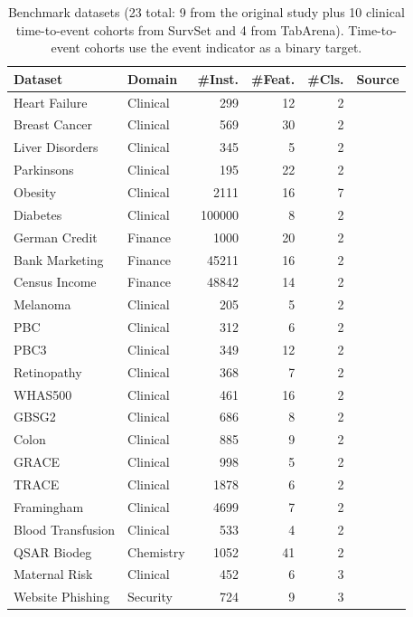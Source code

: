 \documentclass[10pt]{article}\usepackage[margin=1.5cm]{geometry}\usepackage{booktabs,url}\usepackage[numbers]{natbib}
\begin{document}
\begin{table}[t]\centering\small
\setlength{\tabcolsep}{5pt}\renewcommand{\arraystretch}{1.05}
\caption{Benchmark datasets (23 total: 9 from the original study plus 10 clinical time-to-event cohorts from SurvSet and 4 from TabArena). Time-to-event cohorts use the event indicator as a binary target.}
\label{tab:datasets}
\begin{tabular}{@{}llrrrl@{}}\toprule
\textbf{Dataset} & \textbf{Domain} & \textbf{\#Inst.} & \textbf{\#Feat.} & \textbf{\#Cls.} & \textbf{Source} \\ \midrule
Heart Failure & Clinical & 299 & 12 & 2 & \cite{chicco2020ml} \\
Breast Cancer & Clinical & 569 & 30 & 2 & \cite{uci} \\
Liver Disorders & Clinical & 345 & 5 & 2 & \cite{uci} \\
Parkinsons & Clinical & 195 & 22 & 2 & \cite{little2007exploiting} \\
Obesity & Clinical & 2111 & 16 & 7 & \cite{palechor2019dataset} \\
Diabetes & Clinical & 100000 & 8 & 2 & \cite{kaggle_diabetes} \\
German Credit & Finance & 1000 & 20 & 2 & \cite{uci} \\
Bank Marketing & Finance & 45211 & 16 & 2 & \cite{moro2014data} \\
Census Income & Finance & 48842 & 14 & 2 & \cite{kohavi1996scaling} \\
Melanoma & Clinical & 205 & 5 & 2 & \cite{drysdale2022survset} \\
PBC & Clinical & 312 & 6 & 2 & \cite{drysdale2022survset} \\
PBC3 & Clinical & 349 & 12 & 2 & \cite{drysdale2022survset} \\
Retinopathy & Clinical & 368 & 7 & 2 & \cite{drysdale2022survset} \\
WHAS500 & Clinical & 461 & 16 & 2 & \cite{drysdale2022survset} \\
GBSG2 & Clinical & 686 & 8 & 2 & \cite{drysdale2022survset} \\
Colon & Clinical & 885 & 9 & 2 & \cite{drysdale2022survset} \\
GRACE & Clinical & 998 & 5 & 2 & \cite{drysdale2022survset} \\
TRACE & Clinical & 1878 & 6 & 2 & \cite{drysdale2022survset} \\
Framingham & Clinical & 4699 & 7 & 2 & \cite{drysdale2022survset} \\
Blood Transfusion & Clinical & 533 & 4 & 2 & \cite{erickson2025tabarena} \\
QSAR Biodeg & Chemistry & 1052 & 41 & 2 & \cite{erickson2025tabarena} \\
Maternal Risk & Clinical & 452 & 6 & 3 & \cite{erickson2025tabarena} \\
Website Phishing & Security & 724 & 9 & 3 & \cite{erickson2025tabarena} \\
\bottomrule\end{tabular}\end{table}


\end{document}
